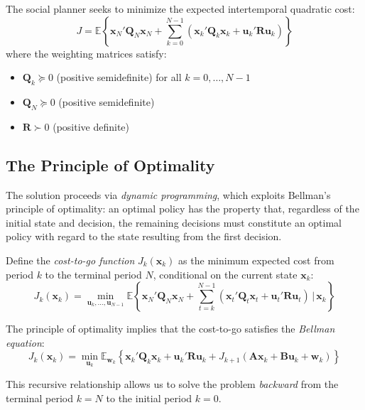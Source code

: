 \documentclass[12pt, a4paper]{article}
\begin{document}
The social planner seeks to minimize the expected intertemporal 
quadratic cost:
\begin{equation}
    J = \mathbb{E} \left\{ \bm{x}_N' \bm{Q}_N \bm{x}_N + 
    \sum_{k=0}^{N-1} \left( \bm{x}_k' \bm{Q}_k \bm{x}_k + 
    \bm{u}_k' \bm{R} \bm{u}_k \right) \right\}
    \label{eq:app_cost}
\end{equation}
where the weighting matrices satisfy:
\begin{itemize}
    \item $\bm{Q}_k \succeq 0$ (positive semidefinite) for all 
    $k = 0, \ldots, N-1$
    \item $\bm{Q}_N \succeq 0$ (positive semidefinite)
    \item $\bm{R} \succ 0$ (positive definite)
\end{itemize}

\subsection{The Principle of Optimality}

The solution proceeds via \textit{dynamic programming}, which 
exploits Bellman's principle of optimality: an optimal policy has 
the property that, regardless of the initial state and decision, 
the remaining decisions must constitute an optimal policy with 
regard to the state resulting from the first decision.

Define the \textit{cost-to-go function} $J_k(\bm{x}_k)$ as the 
minimum expected cost from period $k$ to the terminal period $N$, 
conditional on the current state $\bm{x}_k$:
\begin{equation}
    J_k(\bm{x}_k) = \min_{\bm{u}_k, \ldots, \bm{u}_{N-1}} 
    \mathbb{E} \left\{ \bm{x}_N' \bm{Q}_N \bm{x}_N + 
    \sum_{t=k}^{N-1} \left( \bm{x}_t' \bm{Q}_t \bm{x}_t + 
    \bm{u}_t' \bm{R} \bm{u}_t \right) \,\Big|\, \bm{x}_k \right\}
    \label{eq:app_costtogo}
\end{equation}

The principle of optimality implies that the cost-to-go satisfies 
the \textit{Bellman equation}:
\begin{equation}
    J_k(\bm{x}_k) = \min_{\bm{u}_k} \mathbb{E}_{\bm{w}_k} 
    \left\{ \bm{x}_k' \bm{Q}_k \bm{x}_k + \bm{u}_k' \bm{R} \bm{u}_k 
    + J_{k+1}(\bm{A}\bm{x}_k + \bm{B}\bm{u}_k + \bm{w}_k) \right\}
    \label{eq:app_bellman}
\end{equation}

This recursive relationship allows us to solve the problem 
\textit{backward} from the terminal period $k = N$ to the initial 
period $k = 0$.
\end{document}
